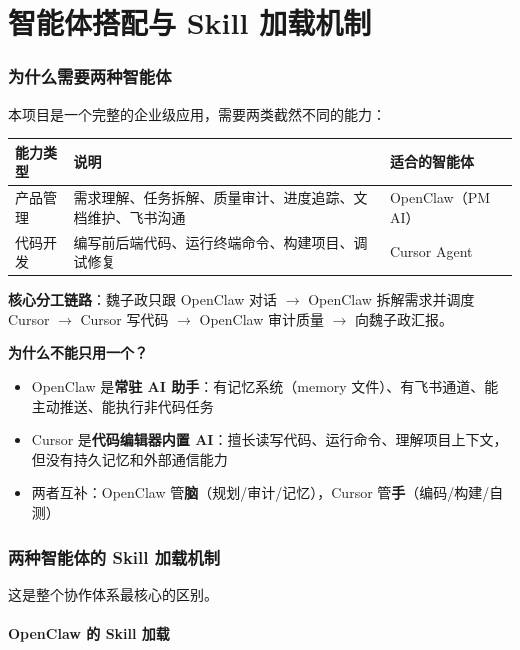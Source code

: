 \documentclass[11pt,a4paper]{article}
\begin{document}
\part{智能体搭配与 Skill 加载机制}

\section{为什么需要两种智能体}

本项目是一个完整的企业级应用，需要两类截然不同的能力：

\begin{table}[h]
\centering
\begin{tabular}{p{3cm}p{4cm}p{4cm}}
\toprule
\textbf{能力类型} & \textbf{说明} & \textbf{适合的智能体} \\
\midrule
产品管理 & 需求理解、任务拆解、质量审计、进度追踪、文档维护、飞书沟通 & OpenClaw（PM AI） \\
代码开发 & 编写前后端代码、运行终端命令、构建项目、调试修复 & Cursor Agent \\
\bottomrule
\end{tabular}
\end{table}

\textbf{核心分工链路}：魏子政只跟 OpenClaw 对话 $\to$ OpenClaw 拆解需求并调度 Cursor $\to$ Cursor 写代码 $\to$ OpenClaw 审计质量 $\to$ 向魏子政汇报。

\textbf{为什么不能只用一个？}

\begin{itemize}[nosep]
  \item OpenClaw 是\textbf{常驻 AI 助手}：有记忆系统（memory 文件）、有飞书通道、能主动推送、能执行非代码任务
  \item Cursor 是\textbf{代码编辑器内置 AI}：擅长读写代码、运行命令、理解项目上下文，但没有持久记忆和外部通信能力
  \item 两者互补：OpenClaw 管\textbf{脑}（规划/审计/记忆），Cursor 管\textbf{手}（编码/构建/自测）
\end{itemize}

\section{两种智能体的 Skill 加载机制}

这是整个协作体系最核心的区别。

\subsection{OpenClaw 的 Skill 加载}
\end{document}
